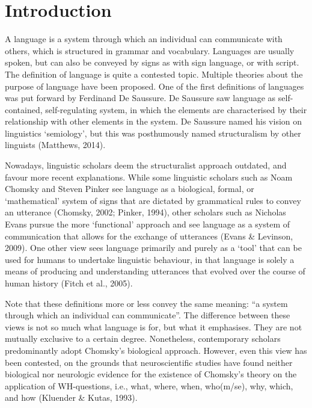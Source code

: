 \setcounter{section}{-1}
\section{Introduction}

A language is a system through which an individual can communicate with others, which is structured in grammar and vocabulary. Languages are usually spoken, but can also be conveyed by signs as with sign language, or with script. The definition of language is quite a contested topic. Multiple theories about the purpose of language have been proposed. One of the first definitions of languages was put forward by Ferdinand De Saussure. De Saussure saw language as self-contained, self-regulating system, in which the elements are characterised by their relationship with other elements in the system. De Saussure named his vision on linguistics ‘semiology’, but this was posthumously named structuralism by other linguists (Matthews, 2014). 

Nowadays, linguistic scholars deem the structuralist approach outdated, and favour more recent explanations. While some linguistic scholars such as Noam Chomsky and Steven Pinker see language as a biological, formal, or ‘mathematical’ system of signs that are dictated by grammatical rules to convey an utterance (Chomsky, 2002; Pinker, 1994), other scholars such as Nicholas Evans pursue the more ‘functional’ approach and see language as a system of communication that allows for the exchange of utterances (Evans \& Levinson, 2009). One other view sees language primarily and purely as a ‘tool’ that can be used for humans to undertake linguistic behaviour, in that language is solely a means of producing and understanding utterances that evolved over the course of human history (Fitch et al., 2005). 

Note that these definitions more or less convey the same meaning: “a system through which an individual can communicate”. The difference between these views is not so much what language is for, but what it emphasises. They are not mutually exclusive to a certain degree. Nonetheless, contemporary scholars predominantly adopt Chomsky's biological approach. However, even this view has been contested, on the grounds that neuroscientific studies have found neither biological nor neurologic evidence for the existence of Chomsky’s theory on the application of WH-questions, i.e., what, where, when, who(m/se), why, which, and how (Kluender \& Kutas, 1993). 


